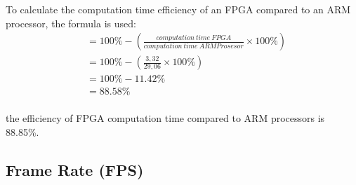 To calculate the computation time efficiency of an FPGA compared to an ARM processor, the formula is used:
\begin{equation*}
    \begin{split}
& = 100\% - \left( \frac{computation\ time\ FPGA}{computation\ time\ ARM Prosesor} \times 100\% \right) \\
& = 100\% - \left( \frac{3,32}{29,06} \times 100\% \right) \\
& = 100\% - 11.42\% \\
& = 88.58\% \\
    \end{split}
\end{equation*}

the efficiency of FPGA computation time compared to ARM processors is 88.85\%.

\subsection{Frame Rate (FPS)}

